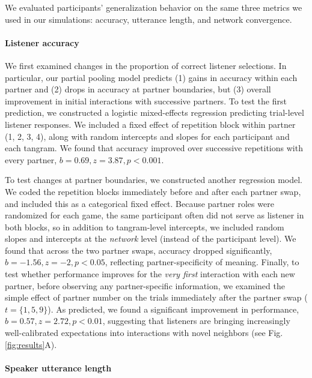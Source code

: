 We evaluated participants' generalization behavior on the same three metrics we used in our simulations: accuracy, utterance length, and network convergence.

\paragraph{Listener accuracy}

We first examined changes in the proportion of correct listener selections.
In particular, our partial pooling model predicts (1) gains in accuracy within each partner and (2) drops in accuracy at partner boundaries, but (3) overall improvement in initial interactions with successive partners.
To test the first prediction, we constructed a logistic mixed-effects regression predicting trial-level listener responses. 
We included a fixed effect of repetition block within partner (1, 2, 3, 4), along with random intercepts and slopes for each participant and each tangram. 
We found that accuracy improved over successive repetitions with every partner, $b=0.69,z=3.87, p<0.001$.

To test changes at partner boundaries, we constructed another regression model.
We coded the repetition blocks immediately before and after each partner swap, and included this as a categorical fixed effect.
Because partner roles were randomized for each game, the same participant often did not serve as listener in both blocks, so in addition to tangram-level intercepts, we included random slopes and intercepts at the \emph{network} level (instead of the participant level).
We found that across the two partner swaps, accuracy dropped significantly, $b = -1.56, z = -2, p < 0.05$, reflecting partner-specificity of meaning.
Finally, to test whether performance improves for the \emph{very first} interaction with each new partner, before observing any partner-specific information, we examined the simple effect of partner number on the trials immediately after the partner swap ($t=\{1,5,9\}$).
As predicted, we found a significant improvement in performance, $b = 0.57, z = 2.72, p < 0.01$, suggesting that listeners are bringing increasingly well-calibrated expectations into interactions with novel neighbors (see Fig. \ref{fig:results}A).


\paragraph{Speaker utterance length}

